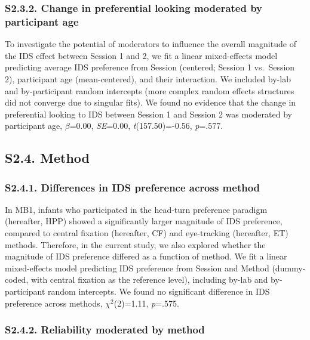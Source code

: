 \documentclass[
  english,
  man, donotrepeattitle,floatsintext]{apa6}
\begin{document}
\hypertarget{s2.3.2.-change-in-preferential-looking-moderated-by-participant-age}{%
\subsubsection{S2.3.2. Change in preferential looking moderated by participant age}\label{s2.3.2.-change-in-preferential-looking-moderated-by-participant-age}}

To investigate the potential of moderators to influence the overall magnitude of the IDS effect between Session 1 and 2, we fit a linear mixed-effects model predicting average IDS preference from Session (centered; Session 1 vs.~Session 2), participant age (mean-centered), and their interaction.
We included by-lab and by-participant random intercepts (more complex random effects structures did not converge due to singular fits).
We found no evidence that the change in preferential looking to IDS between Session 1 and Session 2 was moderated by participant age, \(\beta\)=0.00, \emph{SE}=0.00, \emph{t}(157.50)=-0.56, \emph{p}=.577.

\hypertarget{s2.4.-method}{%
\subsection{S2.4. Method}\label{s2.4.-method}}

\hypertarget{s2.4.1.-differences-in-ids-preference-across-method}{%
\subsubsection{S2.4.1. Differences in IDS preference across method}\label{s2.4.1.-differences-in-ids-preference-across-method}}

In MB1, infants who participated in the head-turn preference paradigm (hereafter, HPP) showed a significantly larger magnitude of IDS preference, compared to central fixation (hereafter, CF) and eye-tracking (hereafter, ET) methods. Therefore, in the current study, we also explored whether the magnitude of IDS preference differed as a function of method. We fit a linear mixed-effects model predicting IDS preference from Session and Method (dummy-coded, with central fixation as the reference level), including by-lab and by-participant random intercepts. We found no significant difference in IDS preference across methods, \({\chi}^2\)(2)=1.11, \emph{p}=.575.

\hypertarget{s2.4.2.-reliability-moderated-by-method}{%
\subsubsection{S2.4.2. Reliability moderated by method}\label{s2.4.2.-reliability-moderated-by-method}}
\end{document}
